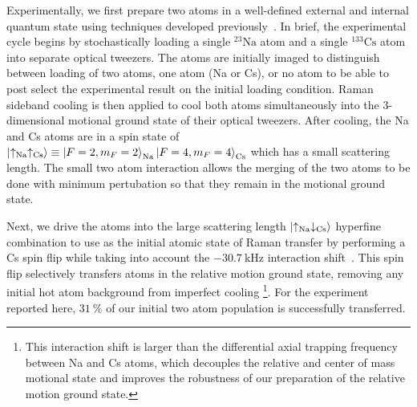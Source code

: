 \documentclass[aps,prl,twocolumn,10pt,superscriptaddress]{revtex4-1}
\newcommand{\Na}{\mathrm{Na}}
\newcommand{\Cs}{\mathrm{Cs}}
\newcommand{\todo}[1]{}
\begin{document}
Experimentally, we first prepare two atoms in a well-defined external and internal quantum state using techniques developed previously~\cite{Liu2018, Liu2019, Wang2019}. In brief, the experimental cycle begins by stochastically loading a single ${}^{23}\Na$ atom and a single ${}^{133}\Cs$ atom into separate optical tweezers. The atoms are initially imaged to distinguish between loading of two atoms, one atom (Na or Cs), or no atom to be able to post select the experimental result on the initial loading condition. Raman sideband cooling is then applied to cool both atoms simultaneously into the 3-dimensional motional ground state of their optical tweezers. After cooling, the Na and Cs atoms are in a spin state of $\ket{\uparrow_{\Na}\uparrow_{\Cs}}\equiv \ket{F=2,m_F=2}_{\Na}\ket{F=4,m_F=4}_{\Cs} $ %
which has a small scattering length. The small two atom interaction allows the merging of the two atoms to be done with minimum pertubation so that they remain in the motional ground state.

Next, we  drive the atoms into the large scattering length $\ket{\uparrow_{\Na} \downarrow_{\Cs}}$ hyperfine combination to use as the initial atomic state of Raman transfer by performing a Cs spin flip while taking into account the $-30.7~\mathrm{kHz}$ interaction shift~\cite{Hood2019}.  %
This spin flip selectively transfers atoms in the relative motion ground state, removing any initial hot atom background from imperfect cooling \footnote{This interaction shift is larger than the differential axial trapping frequency between Na and Cs atoms, which decouples the relative and center of mass motional state and improves the robustness of our preparation of the relative motion ground state.}. For the experiment reported here, $31~\mathrm{\%}$ of our initial two atom population is successfully transferred.
\end{document}
